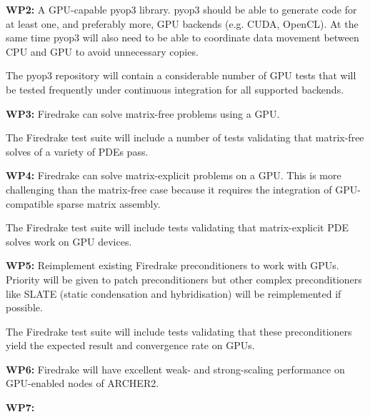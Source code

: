 \documentclass[a4paper,11pt]{article}
\begin{document}
\noindent\textbf{WP2:} A GPU-capable pyop3 library. pyop3 should be able to generate code for at least one, and preferably more, GPU backends (e.g. CUDA, OpenCL). At the same time pyop3 will also need to be able to coordinate data movement between CPU and GPU to avoid unnecessary copies.

The pyop3 repository will contain a considerable number of GPU tests that will be tested frequently under continuous integration for all supported backends. 

\noindent\textbf{WP3:} Firedrake can solve matrix-free problems using a GPU. 

The Firedrake test suite will include a number of tests validating that matrix-free solves of a variety of PDEs pass. 

\noindent\textbf{WP4:} Firedrake can solve matrix-explicit problems on a GPU. This is more challenging than the matrix-free case because it requires the integration of GPU-compatible sparse matrix assembly. 

The Firedrake test suite will include tests validating that matrix-explicit PDE solves work on GPU devices. 

\noindent\textbf{WP5:} Reimplement existing Firedrake preconditioners to work with GPUs. Priority will be given to patch preconditioners but other complex preconditioners like SLATE (static condensation and hybridisation) will be reimplemented if possible. 

The Firedrake test suite will include tests validating that these preconditioners yield the expected result and convergence rate on GPUs. 

\noindent\textbf{WP6:} Firedrake will have excellent weak- and strong-scaling performance on GPU-enabled nodes of ARCHER2. 
	
\noindent\textbf{WP7:}


\clearpage
\end{document}

